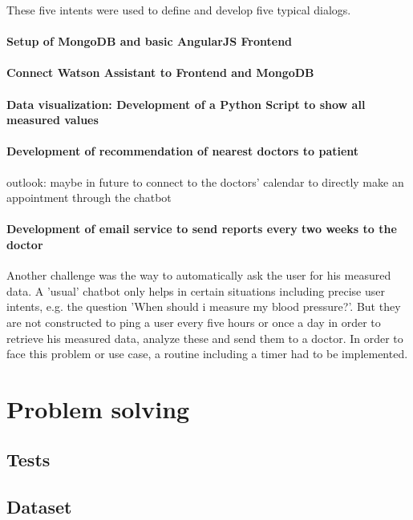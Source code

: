 These five intents were used to define and develop five typical dialogs.

\paragraph{Setup of MongoDB and basic AngularJS Frontend}

\paragraph{Connect Watson Assistant to Frontend and MongoDB}

\paragraph{Data visualization: Development of a Python Script to show all measured values}

\paragraph{Development of recommendation of nearest doctors to patient}
outlook: maybe in future to connect to the doctors' calendar to directly make an appointment through the chatbot

\paragraph{Development of email service to send reports every two weeks to the doctor}

Another challenge was the way to automatically ask the user for his measured data. A 'usual' chatbot only helps in certain situations including precise user intents, e.g. the question 'When should i measure my blood pressure?'. But they are not constructed to ping a user every five hours or once a day in order to retrieve his measured data, analyze these and send them to a doctor. 
In order to face this problem or use case, a routine including a timer had to be implemented.

\section{Problem solving}
\subsection{Tests}
\subsection{Dataset}
